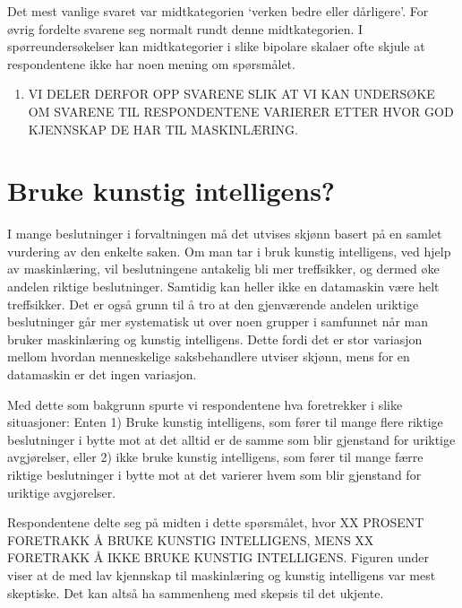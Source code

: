\documentclass[
]{book}
\providecommand{\tightlist}{%
  \setlength{\itemsep}{0pt}\setlength{\parskip}{0pt}}
\begin{document}
Det mest vanlige svaret var midtkategorien `verken bedre eller dårligere'.
For øvrig fordelte svarene seg normalt rundt denne midtkategorien.
I spørreundersøkelser kan midtkategorier i slike bipolare skalaer ofte skjule at respondentene ikke har noen mening om spørsmålet.

\begin{enumerate}
\def\labelenumi{\arabic{enumi}.}
\tightlist
\item
  VI DELER DERFOR OPP SVARENE SLIK AT VI KAN UNDERSØKE OM SVARENE TIL RESPONDENTENE VARIERER ETTER HVOR GOD KJENNSKAP DE HAR TIL MASKINLÆRING.
\end{enumerate}

\hypertarget{bruke-kunstig-intelligens}{%
\section{Bruke kunstig intelligens?}\label{bruke-kunstig-intelligens}}

I mange beslutninger i forvaltningen må det utvises skjønn basert på en samlet vurdering av den enkelte saken.
Om man tar i bruk kunstig intelligens, ved hjelp av maskinlæring, vil beslutningene antakelig bli mer treffsikker, og dermed øke andelen riktige beslutninger.
Samtidig kan heller ikke en datamaskin være helt treffsikker.
Det er også grunn til å tro at den gjenværende andelen uriktige beslutninger går mer systematisk ut over noen grupper i samfunnet når man bruker maskinlæring og kunstig intelligens.
Dette fordi det er stor variasjon mellom hvordan menneskelige saksbehandlere utviser skjønn, mens for en datamaskin er det ingen variasjon.

Med dette som bakgrunn spurte vi respondentene hva foretrekker i slike situasjoner:
Enten 1) Bruke kunstig intelligens, som fører til mange flere riktige beslutninger i bytte mot at det alltid er de samme som blir gjenstand for uriktige avgjørelser, eller 2) ikke bruke kunstig intelligens, som fører til mange færre riktige beslutninger i bytte mot at det varierer hvem som blir gjenstand for uriktige avgjørelser.

Respondentene delte seg på midten i dette spørsmålet, hvor XX PROSENT FORETRAKK Å BRUKE KUNSTIG INTELLIGENS, MENS XX FORETRAKK Å IKKE BRUKE KUNSTIG INTELLIGENS.
Figuren under viser at de med lav kjennskap til maskinlæring og kunstig intelligens var mest skeptiske.
Det kan altså ha sammenheng med skepsis til det ukjente.
\end{document}
